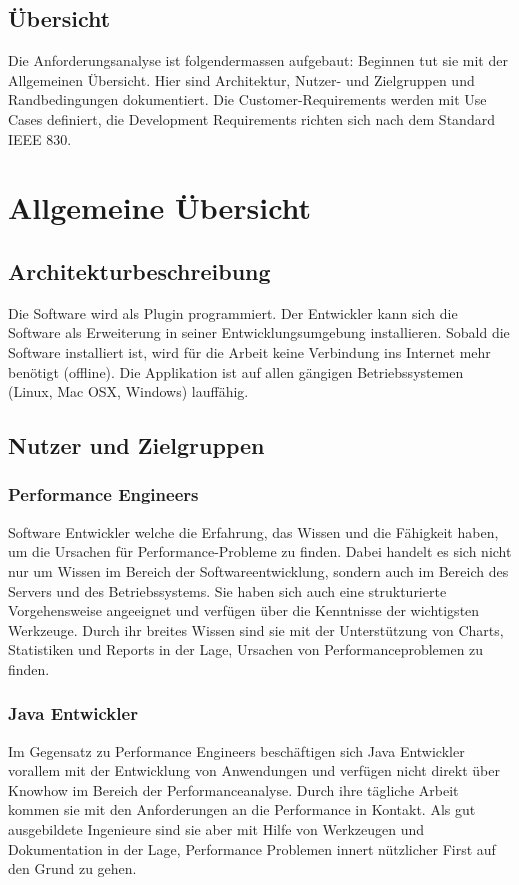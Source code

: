 \subsection{Übersicht}
Die Anforderungsanalyse ist folgendermassen aufgebaut: Beginnen tut sie mit der Allgemeinen Übersicht. Hier sind Architektur, Nutzer- und Zielgruppen und Randbedingungen dokumentiert. Die Customer-Requirements werden mit Use Cases definiert, die Development Requirements richten sich nach dem Standard IEEE 830.

\section{Allgemeine Übersicht}\label{allgemeine_uebersicht}
\subsection{Architekturbeschreibung}
Die Software wird als Plugin programmiert. Der Entwickler kann sich die Software als Erweiterung in seiner Entwicklungsumgebung installieren. Sobald die Software installiert ist, wird für die Arbeit keine Verbindung ins Internet mehr benötigt (offline). Die Applikation ist auf allen gängigen Betriebssystemen (Linux, Mac OSX, Windows) lauffähig.

\subsection{Nutzer und Zielgruppen}
\subsubsection{Performance Engineers}
Software Entwickler welche die Erfahrung, das Wissen und die Fähigkeit haben, um die Ursachen für Performance-Probleme zu finden. Dabei handelt es sich nicht nur um Wissen im Bereich der Softwareentwicklung, sondern auch im Bereich des Servers und des Betriebssystems. Sie haben sich auch eine strukturierte Vorgehensweise angeeignet und verfügen über die Kenntnisse der wichtigsten Werkzeuge. Durch ihr breites Wissen sind sie mit der Unterstützung von Charts, Statistiken und Reports in der Lage, Ursachen von Performanceproblemen zu finden.

\subsubsection{Java Entwickler}
Im Gegensatz zu Performance Engineers beschäftigen sich Java Entwickler vorallem mit der Entwicklung von Anwendungen und verfügen nicht direkt über Knowhow im Bereich der Performanceanalyse. Durch ihre tägliche Arbeit kommen sie mit den Anforderungen an die Performance in Kontakt. Als gut ausgebildete Ingenieure sind sie aber mit Hilfe von Werkzeugen und Dokumentation in der Lage, Performance Problemen innert nützlicher First auf den Grund zu gehen.


